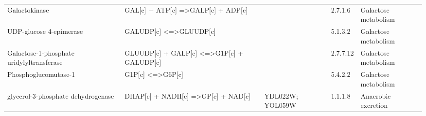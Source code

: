 \begin{table}[H]
\begin{center}
{\begin{tabular}{p{11cm}p{17cm}p{8cm}lp{5cm}}
Galactokinase                                                                             & GAL{[}c{]} + ATP{[}c{]} =\textgreater GALP{[}c{]} + ADP{[}c{]}                                                                                  &                                                                                                                                                                  & 2.7.1.6            & Galactose metabolism                                                        \\
UDP-glucose 4-epimerase                                                                   & GALUDP{[}c{]} \textless{}=\textgreater GLUUDP{[}c{]}                                                                                            &                                                                                                                                                                  & 5.1.3.2            & Galactose metabolism                                                        \\
Galactose-1-phosphate uridylyltransferase                                                 & GLUUDP{[}c{]} + GALP{[}c{]} \textless{}=\textgreater G1P{[}c{]} + GALUDP{[}c{]}                                                                 &                                                                                                                                                                  & 2.7.7.12           & Galactose metabolism                                                        \\
Phosphoglucomutase-1                                                                      & G1P{[}c{]} \textless{}=\textgreater G6P{[}c{]}                                                                                                  &                                                                                                                                                                  & 5.4.2.2            & Galactose metabolism                                                        \\
glycerol-3-phosphate dehydrogenase                                                        & DHAP{[}c{]} + NADH{[}c{]} =\textgreater GP{[}c{]} + NAD{[}c{]}                                                                                  & YDL022W; YOL059W                                                                                                                                                 & 1.1.1.8            & Anaerobic excretion                                                         \\

\end{tabular}}
\end{center}
\end{table}
